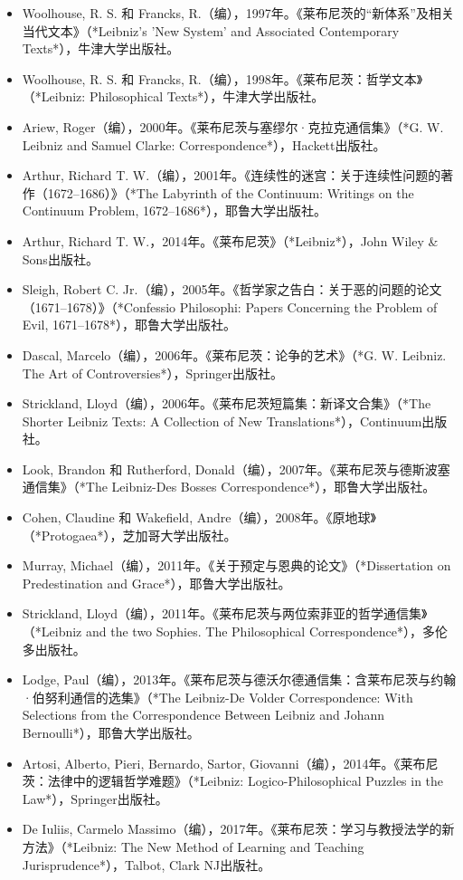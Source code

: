 \begin{itemize}
\item Woolhouse, R. S. 和 Francks, R.（编），1997年。《莱布尼茨的“新体系”及相关当代文本》（*Leibniz's 'New System' and Associated Contemporary Texts*），牛津大学出版社。
\item Woolhouse, R. S. 和 Francks, R.（编），1998年。《莱布尼茨：哲学文本》（*Leibniz: Philosophical Texts*），牛津大学出版社。
\item Ariew, Roger（编），2000年。《莱布尼茨与塞缪尔·克拉克通信集》（*G. W. Leibniz and Samuel Clarke: Correspondence*），Hackett出版社。
\item Arthur, Richard T. W.（编），2001年。《连续性的迷宫：关于连续性问题的著作（1672–1686）》（*The Labyrinth of the Continuum: Writings on the Continuum Problem, 1672–1686*），耶鲁大学出版社。
\item Arthur, Richard T. W.，2014年。《莱布尼茨》（*Leibniz*），John Wiley & Sons出版社。
\item Sleigh, Robert C. Jr.（编），2005年。《哲学家之告白：关于恶的问题的论文（1671–1678）》（*Confessio Philosophi: Papers Concerning the Problem of Evil, 1671–1678*），耶鲁大学出版社。
\item Dascal, Marcelo（编），2006年。《莱布尼茨：论争的艺术》（*G. W. Leibniz. The Art of Controversies*），Springer出版社。
\item Strickland, Lloyd（编），2006年。《莱布尼茨短篇集：新译文合集》（*The Shorter Leibniz Texts: A Collection of New Translations*），Continuum出版社。
\item Look, Brandon 和 Rutherford, Donald（编），2007年。《莱布尼茨与德斯波塞通信集》（*The Leibniz-Des Bosses Correspondence*），耶鲁大学出版社。
\item Cohen, Claudine 和 Wakefield, Andre（编），2008年。《原地球》（*Protogaea*），芝加哥大学出版社。
\item Murray, Michael（编），2011年。《关于预定与恩典的论文》（*Dissertation on Predestination and Grace*），耶鲁大学出版社。
\item Strickland, Lloyd（编），2011年。《莱布尼茨与两位索菲亚的哲学通信集》（*Leibniz and the two Sophies. The Philosophical Correspondence*），多伦多出版社。
\item Lodge, Paul（编），2013年。《莱布尼茨与德沃尔德通信集：含莱布尼茨与约翰·伯努利通信的选集》（*The Leibniz-De Volder Correspondence: With Selections from the Correspondence Between Leibniz and Johann Bernoulli*），耶鲁大学出版社。
\item Artosi, Alberto, Pieri, Bernardo, Sartor, Giovanni（编），2014年。《莱布尼茨：法律中的逻辑哲学难题》（*Leibniz: Logico-Philosophical Puzzles in the Law*），Springer出版社。
\item De Iuliis, Carmelo Massimo（编），2017年。《莱布尼茨：学习与教授法学的新方法》（*Leibniz: The New Method of Learning and Teaching Jurisprudence*），Talbot, Clark NJ出版社。  
\end{itemize}
